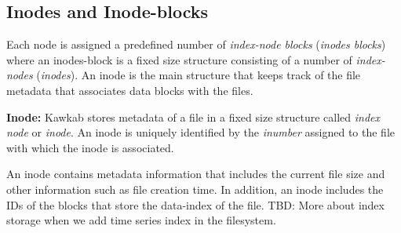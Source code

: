 \documentclass[]{article}
\newcommand{\subtopic}[1]{\vspace{1.5pt} \noindent \textbf{#1}}
\newcommand{\hl}[1]{\textcolor{hlcolor}{#1}}
\begin{document}
\subsection{Inodes and Inode-blocks} 

Each node is assigned a predefined number of \textit{index-node blocks}
(\textit{inodes blocks}) where an inodes-block is a fixed size structure
consisting of a number of \textit{index-nodes} (\textit{inodes}).  An inode
is the main structure that keeps track of the file metadata that associates
data blocks with the files.


\subtopic{Inode:} Kawkab stores metadata of a file in a fixed size structure
called \textit{index node} or \textit{inode}. An inode is uniquely identified by
the \textit{inumber} assigned to the file with which the inode is associated.

An inode contains metadata information that includes the current file size 
and other information such as file creation time. In addition, an inode includes
the IDs of the blocks that store the data-index of the file.
\hl{TBD: More about index storage when we add time series index in the
filesystem.}


%
%
%
%
%
\end{document}
